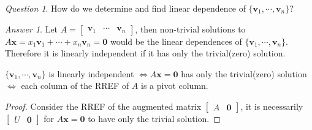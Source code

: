 \documentclass{beamer}
\theoremstyle{definition}
\theoremstyle{remark}
\newtheorem*{question}{Question}
\newtheorem*{answer}{Answer}
\begin{document}
\begin{frame}[t]
\begin{question}
How do we determine and find linear dependence of $\{\mathbf v_1,\cdots,\mathbf v_n\}$?
\end{question}
\pause
\begin{answer}
Let $A=\begin{bmatrix}
\mathbf v_1&\cdots&\mathbf v_n
\end{bmatrix}$, then non-trivial solutions to $A\mathbf x=x_1\mathbf v_1+\cdots+x_n\mathbf v_n=\mathbf0$ would be the linear dependences of $\{\mathbf v_1,\cdots,\mathbf v_n\}$. Therefore it is linearly independent if it has only the trivial(zero) solution.
\end{answer}
\pause
\begin{theorem} 
$\{\mathbf v_1,\cdots,\mathbf v_n\}$ is linearly independent $\iff A\mathbf x=\mathbf 0$ has only the trivial(zero) solution $\iff$ each column of the RREF of $A$ is a pivot column.
\end{theorem}
\pause
\begin{proof}
Consider the RREF of the augmented matrix $\begin{bmatrix}
A&\mathbf 0
\end{bmatrix}$, it is necessarily $\begin{bmatrix}
U&\mathbf 0
\end{bmatrix}$ for $A\mathbf x=\mathbf0$ to have only the trivial solution.
\end{proof}
\end{frame}
\end{document}
